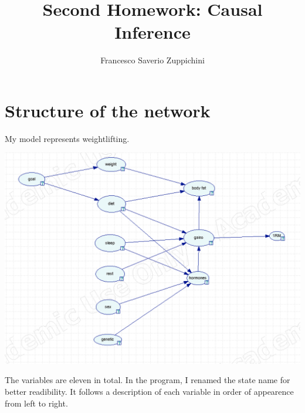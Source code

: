 \documentclass[11pt]{article}
\title{Second Homework: Causal Inference}
\author{Francesco Saverio Zuppichini}
\begin{document}
\maketitle
\section{Structure of the network}
My model represents weightlifting.  

\includegraphics[width=\textwidth]{./images/net.png}

The variables are eleven in total. In the program, I renamed the state
name for better readibility. It follows a description of each variable
in order of appearence from left to right.
\end{document}
